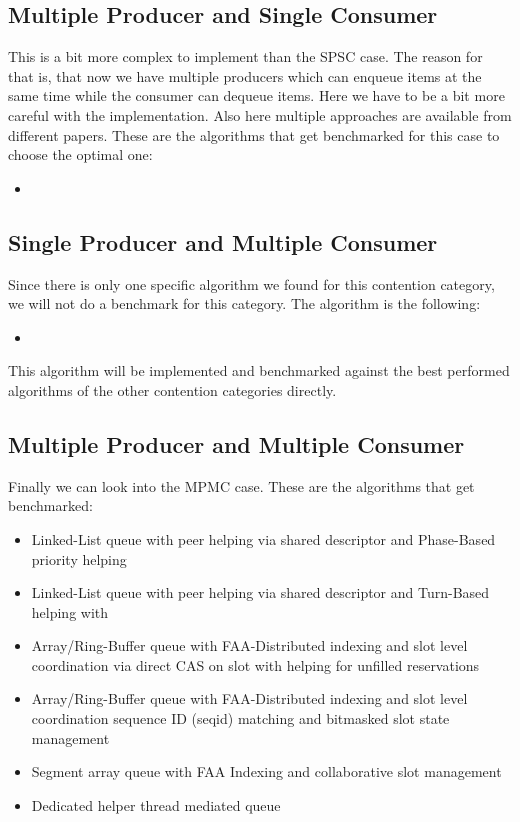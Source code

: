 \subsection{Multiple Producer and Single Consumer}\label{subsec:multiple-producer-and-single-consumer}
This is a bit more complex to implement than the \ac{SPSC} case. The reason for that is, that now we have multiple producers which can enqueue items at the same time while the consumer can dequeue items. Here we have to be a bit more careful with the implementation. Also here multiple approaches are available from different papers. These are the algorithms that get benchmarked for this case to choose the optimal one: 
\begin{itemize}
   \item 
\end{itemize}

\subsection{Single Producer and Multiple Consumer}\label{subsec:single-producer-and-multiple-consumer}
Since there is only one specific algorithm we found for this contention category, we will not do a benchmark for this category. The algorithm is the following:
\begin{itemize}
   \item 
\end{itemize}
This algorithm will be implemented and benchmarked against the best performed algorithms of the other contention categories directly.


\subsection{Multiple Producer and Multiple Consumer}\label{subsec:multiple-producer-and-multiple-consumer}
Finally we can look into the \ac{MPMC} case. These are the algorithms that get benchmarked:
\begin{itemize}
   \item Linked-List queue with peer helping via shared descriptor and Phase-Based priority helping \cite{Kogan2011WaitFreeQueues,kogan2012methodology}
   \item Linked-List queue with peer helping via shared descriptor and Turn-Based helping with \cite{RamalheteQueue}
   \item Array/Ring-Buffer queue with \ac{FAA}-Distributed indexing and slot level coordination via direct CAS on slot with helping for unfilled reservations \cite{FastFetchAndAddWaitFreeQueue}
   \item Array/Ring-Buffer queue with \ac{FAA}-Distributed indexing and slot level coordination sequence ID (seqid) matching and bitmasked slot state management \cite{FeldmanDechev2015WaitFreeRingBuffer,FeldmanDechevV2,FeldmanDechevV3}
   \item Segment array queue with \ac{FAA} Indexing and collaborative slot management \cite{wCQWaitFreeQueue}
   \item Dedicated helper thread mediated queue \cite{Verma2013Scalable}
\end{itemize}
